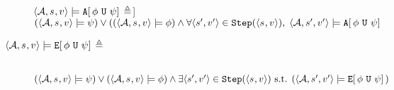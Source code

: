 \begin{description}
   $
      \langle
         \mathcal{A}{},
         s_{},
         v_{}
      \rangle{}
      \models
      \text{\texttt{A}}[ \,\phi~\text{\texttt{U}}~\psi] \, \triangleq
   $]~~\\
   $
      (
         \langle
            \automatasystem{},
            \automatastate{},
            \automataenvironment{}
         \rangle{}
         \models \psi
      )
      \lor
      (
         (
            \langle
               \automatasystem{},
               \automatastate{},
               \automataenvironment{}
            \rangle{}
            \models \phi
         )
         \land
      \forallin{%
         \langle{}
            \automatastate{}',
            \automataenvironment{}'
         \rangle{}
      }{\automatanext{}(\langle{} \automatastate{}, \automataenvironment{} \rangle{})}{%
         \langle
            \automatasystem{},
            \automatastate{}',
            \automataenvironment{}'
         \rangle{}
         \models
         \auop{\phi}{\psi}
      }
   $
\item[%
   $
      \langle
         \mathcal{A}{},
         s_{},
         v_{}
      \rangle{}
      \models
      \text{\texttt{E}}[ \,\phi~\text{\texttt{U}}~\psi] \, \triangleq
   $]~~\\
   $
      (
         \langle
            \automatasystem{},
            \automatastate{},
            \automataenvironment{}
         \rangle{}
         \models \psi
      )
      \lor
         (
            \langle
               \automatasystem{},
               \automatastate{},
               \automataenvironment{}
            \rangle{}
            \models \phi
         )
         \land
      \existsin{%
         \langle{}
            \automatastate{}',
            \automataenvironment{}'
         \rangle{}
      }{\automatanext{}(\langle{} \automatastate{}, \automataenvironment{} \rangle{})}{%
         \langle
            \automatasystem{},
            \automatastate{}',
            \automataenvironment{}'
         \rangle{}
         \models
         \euop{\phi}{\psi}
      }
   $
\end{description}
\fi
\iffalse
